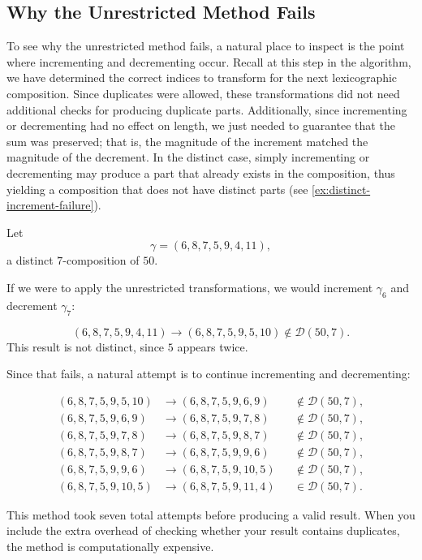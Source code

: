 \subsection{Why the Unrestricted Method Fails}
\label{sec:unrestricted-method-fails}

To see why the unrestricted method fails, a natural place to inspect is the point where incrementing and decrementing occur. Recall at this step in the algorithm, we have determined the correct indices to transform for the next lexicographic composition. Since duplicates were allowed, these transformations did not need additional checks for producing duplicate parts. Additionally, since incrementing or decrementing had no effect on length, we just needed to guarantee that the sum was preserved; that is, the magnitude of the increment matched the magnitude of the decrement. In the distinct case, simply incrementing or decrementing may produce a part that already exists in the composition, thus yielding a composition that does not have distinct parts (see \cref{ex:distinct-increment-failure}).

\begin{example}
\label{ex:distinct-increment-failure}

Let
\[
    \gamma = (6, 8, 7, 5, 9, 4, 11),
\]
a distinct $7$-composition of $50$.

If we were to apply the unrestricted transformations, we would increment $\gamma_6$ and decrement $\gamma_7$:

\[
    (6, 8, 7, 5, 9, 4, 11) \longrightarrow (6, 8, 7, 5, 9, 5, 10) \notin \mathcal{D}(50,7).
\]
This result is not distinct, since $5$ appears twice.

Since that fails, a natural attempt is to continue incrementing and decrementing:

\[
    \begin{aligned}
        (6, 8, 7, 5, 9, 5, 10) &\longrightarrow (6, 8, 7, 5, 9, 6, 9)  &&\notin \mathcal{D}(50,7), \\
        (6, 8, 7, 5, 9, 6, 9)  &\longrightarrow (6, 8, 7, 5, 9, 7, 8)  &&\notin \mathcal{D}(50,7), \\
        (6, 8, 7, 5, 9, 7, 8)  &\longrightarrow (6, 8, 7, 5, 9, 8, 7)  &&\notin \mathcal{D}(50,7), \\
        (6, 8, 7, 5, 9, 8, 7)  &\longrightarrow (6, 8, 7, 5, 9, 9, 6)  &&\notin \mathcal{D}(50,7), \\
        (6, 8, 7, 5, 9, 9, 6)  &\longrightarrow (6, 8, 7, 5, 9, 10, 5) &&\notin \mathcal{D}(50,7), \\
        (6, 8, 7, 5, 9, 10, 5) &\longrightarrow (6, 8, 7, 5, 9, 11, 4) &&\in \mathcal{D}(50,7).
    \end{aligned}
\]

This method took seven total attempts before producing a valid result. When you include the extra overhead of checking whether your result contains duplicates, the method is computationally expensive.

\end{example}

